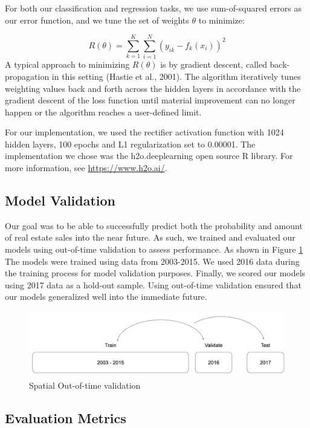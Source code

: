 \documentclass[conference,final,]{IEEEtran}
\makeatletter
\def\maxwidth{\ifdim\Gin@nat@width>\linewidth\linewidth
\else\Gin@nat@width\fi}
\let\Oldincludegraphics\includegraphics
\renewcommand{\includegraphics}[1]{\Oldincludegraphics[width=\maxwidth]{#1}}
\makeatother
\begin{document}
For both our classification and regression tasks, we use sum-of-squared
errors as our error function, and we tune the set of weights \(\theta\)
to minimize:

\[
R(\theta)=\sum_{k=1}^K\sum_{i=1}^N(y_{ik}-f_{k}(x_i))^2
\] A typical approach to minimizing \(R(\theta)\) is by gradient
descent, called back-propagation in this setting (Hastie et al., 2001).
The algorithm iteratively tunes weighting values back and forth across
the hidden layers in accordance with the gradient descent of the loss
function until material improvement can no longer happen or the
algorithm reaches a user-defined limit.

For our implementation, we used the rectifier activation function with
1024 hidden layers, 100 epochs and L1 regularization set to 0.00001. The
implementation we chose was the h2o.deeplearning open source R library.
For more information, see \url{https://www.h2o.ai/}.

\hypertarget{model-validation}{%
\subsection{Model Validation}\label{model-validation}}

Our goal was to be able to successfully predict both the probability and
amount of real estate sales into the near future. As such, we trained
and evaluated our models using out-of-time validation to assess
performance. As shown in Figure \ref{fig:Train Test Validate} The models
were trained using data from 2003-2015. We used 2016 data during the
training process for model validation purposes. Finally, we scored our
models using 2017 data as a hold-out sample. Using out-of-time
validation ensured that our models generalized well into the immediate
future.

\begin{figure}
\centering
\includegraphics{Sections/tables_and_figures/Train_Validate_Test.png}
\caption{\label{fig:Train Test Validate}Spatial Out-of-time validation}
\end{figure}

\hypertarget{evaluation-metrics}{%
\subsection{Evaluation Metrics}\label{evaluation-metrics}}
\end{document}

